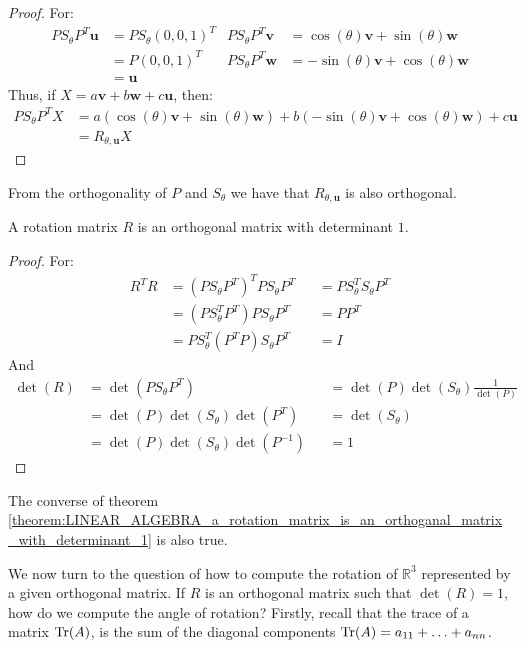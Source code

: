 \documentclass[../main.tex]{subfiles}
\begin{document}
\begin{proof}
For:
\begin{align*}
    PS_{\theta}P^T\mathbf{u} &= PS_{\theta} (0,0,1)^{T} & PS_{\theta}P^{T}\mathbf{v} &= \cos(\theta)\mathbf{v}+\sin(\theta) \mathbf{w}\\
    &= P(0,0,1)^{T} & PS_{\theta}P^{T} \mathbf{w} &= -\sin(\theta) \mathbf{v}+\cos(\theta) \mathbf{w}\\
    &= \mathbf{u}
\end{align*}
Thus, if $X = a\mathbf{v}+b\mathbf{w}+c\mathbf{u}$, then:
\begin{align*}
    PS_{\theta}P^TX &= a(\cos(\theta)\mathbf{v}+\sin(\theta)\mathbf{w})+b(-\sin(\theta) \mathbf{v}+\cos(\theta)\mathbf{w})+c\mathbf{u}\\
    &= R_{\theta,\mathbf{u}}X
\end{align*}
\end{proof}
%
From the orthogonality of $P$ and $S_{\theta}$ we have that $R_{\theta,\mathbf{u}}$ is also orthogonal.
%
\begin{theorem}
\label{theorem:LINEAR_ALGEBRA_a_rotation_matrix_is_an_orthoganal_matrix_with_determinant_1}
A rotation matrix $R$ is an orthogonal matrix with determinant $1$.
\end{theorem}
\begin{proof}
For:
\begin{align*}
    R^{T}R &= (PS_{\theta}P^{T})^{T}PS_{\theta}P^{T} & &=PS_{\theta}^{T}S_{\theta}P^{T}\\
    &= (PS_{\theta}^{T}P^{T})PS_{\theta}P^{T} & &= PP^{T}\\
    &= PS_{\theta}^{T}(P^{T}P)S_{\theta}P^{T} & &= I
\end{align*}
%
And
%
\begin{align*}
    \det(R) &= \det(PS_{\theta}P^T) & &=\det(P)\det(S_{\theta})\frac{1}{\det(P)}\\
    &= \det(P)\det(S_{\theta})\det(P^T) & &= \det(S_{\theta})\\
    &= \det(P)\det(S_{\theta})\det(P^{-1}) & &= 1
\end{align*}
\end{proof}
%
\begin{remark}
The converse of theorem \ref{theorem:LINEAR_ALGEBRA_a_rotation_matrix_is_an_orthoganal_matrix_with_determinant_1} is also true.
\end{remark}
%
We now turn to the question of how to compute the rotation of $\mathbb{R}^3$ represented by a given orthogonal matrix. If $R$ is an orthogonal matrix such that $\det(R) = 1$, how do we compute the angle of rotation? Firstly, recall that the trace of a matrix $\Tr(A)$, is the sum of the diagonal components $\Tr(A) = a_{11}+\hdots + a_{nn}$.
\end{document}
